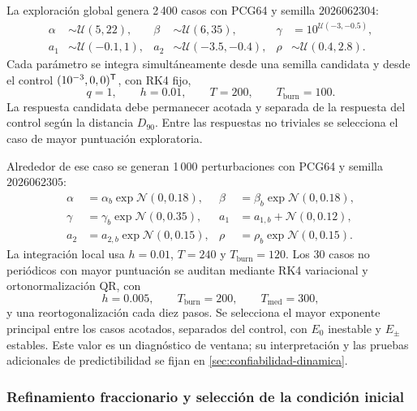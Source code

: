La exploración global genera 2\,400 casos con PCG64 y semilla
\(2026062304\):
\begin{equation}
\begin{aligned}
\alpha&\sim\mathcal U(5,22),&
\beta&\sim\mathcal U(6,35),&
\gamma&=10^{\mathcal U(-3,-0.5)},\\
a_1&\sim\mathcal U(-0.1,1),&
a_2&\sim\mathcal U(-3.5,-0.4),&
\rho&\sim\mathcal U(0.4,2.8).
\end{aligned}
\label{eq:distribucion_global_c590}
\end{equation}
Cada parámetro se integra simultáneamente desde una semilla candidata y desde
el control \((10^{-3},0,0)^{\mathsf T}\), con RK4 fijo,
\[
q=1,\qquad h=0.01,\qquad T=200,\qquad T_{\mathrm{burn}}=100.
\]
La respuesta candidata debe permanecer acotada y separada de la respuesta del
control según la distancia \(D_{90}\). Entre las respuestas no triviales se
selecciona el caso de mayor puntuación exploratoria.

Alrededor de ese caso se generan 1\,000 perturbaciones con PCG64 y semilla
\(2026062305\):
\begin{equation}
\begin{aligned}
\alpha&=\alpha_b\exp\mathcal N(0,0.18),&
\beta&=\beta_b\exp\mathcal N(0,0.18),\\
\gamma&=\gamma_b\exp\mathcal N(0,0.35),&
a_1&=a_{1,b}+\mathcal N(0,0.12),\\
a_2&=a_{2,b}\exp\mathcal N(0,0.15),&
\rho&=\rho_b\exp\mathcal N(0,0.15).
\end{aligned}
\label{eq:perturbacion_local_c590}
\end{equation}
La integración local usa \(h=0.01\), \(T=240\) y
\(T_{\mathrm{burn}}=120\). Los 30 casos no periódicos con mayor puntuación se
auditan mediante RK4 variacional y ortonormalización QR, con
\[
h=0.005,\qquad T_{\mathrm{burn}}=200,\qquad
T_{\mathrm{med}}=300,
\]
y una reortogonalización cada diez pasos. Se selecciona el mayor exponente
principal entre los casos acotados, separados del control, con \(E_0\)
inestable y \(E_\pm\) estables. Este valor es un diagnóstico de ventana; su
interpretación y las pruebas adicionales de predictibilidad se fijan en
\cref{sec:confiabilidad-dinamica}.

\subsubsection{Refinamiento fraccionario y selección de la condición inicial}

